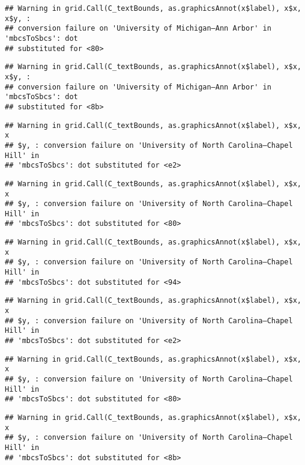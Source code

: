 \documentclass[]{article}
\begin{document}
\begin{verbatim}
## Warning in grid.Call(C_textBounds, as.graphicsAnnot(x$label), x$x, x$y, :
## conversion failure on 'University of Michigan—​Ann Arbor' in 'mbcsToSbcs': dot
## substituted for <80>
\end{verbatim}

\begin{verbatim}
## Warning in grid.Call(C_textBounds, as.graphicsAnnot(x$label), x$x, x$y, :
## conversion failure on 'University of Michigan—​Ann Arbor' in 'mbcsToSbcs': dot
## substituted for <8b>
\end{verbatim}

\begin{verbatim}
## Warning in grid.Call(C_textBounds, as.graphicsAnnot(x$label), x$x, x
## $y, : conversion failure on 'University of North Carolina—​Chapel Hill' in
## 'mbcsToSbcs': dot substituted for <e2>
\end{verbatim}

\begin{verbatim}
## Warning in grid.Call(C_textBounds, as.graphicsAnnot(x$label), x$x, x
## $y, : conversion failure on 'University of North Carolina—​Chapel Hill' in
## 'mbcsToSbcs': dot substituted for <80>
\end{verbatim}

\begin{verbatim}
## Warning in grid.Call(C_textBounds, as.graphicsAnnot(x$label), x$x, x
## $y, : conversion failure on 'University of North Carolina—​Chapel Hill' in
## 'mbcsToSbcs': dot substituted for <94>
\end{verbatim}

\begin{verbatim}
## Warning in grid.Call(C_textBounds, as.graphicsAnnot(x$label), x$x, x
## $y, : conversion failure on 'University of North Carolina—​Chapel Hill' in
## 'mbcsToSbcs': dot substituted for <e2>
\end{verbatim}

\begin{verbatim}
## Warning in grid.Call(C_textBounds, as.graphicsAnnot(x$label), x$x, x
## $y, : conversion failure on 'University of North Carolina—​Chapel Hill' in
## 'mbcsToSbcs': dot substituted for <80>
\end{verbatim}

\begin{verbatim}
## Warning in grid.Call(C_textBounds, as.graphicsAnnot(x$label), x$x, x
## $y, : conversion failure on 'University of North Carolina—​Chapel Hill' in
## 'mbcsToSbcs': dot substituted for <8b>
\end{verbatim}
\end{document}
